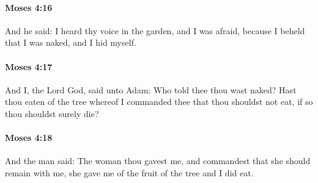 		\paragraph{Moses 4:16} %
			\label{MOSES-4-16}

			And he said: I heard thy voice in the garden, and I was afraid, because I beheld that I was naked, and I hid myself.


		\paragraph{Moses 4:17} %
			\label{MOSES-4-17}

			And I, the Lord God, said unto Adam: Who told thee thou wast naked? Hast thou eaten of the tree whereof I commanded thee that thou shouldst not eat, if so thou shouldst surely die?


		\paragraph{Moses 4:18} %
			\label{MOSES-4-18}

			And the man said: The woman thou gavest me, and commandest that she should remain with me, she gave me of the fruit of the tree and I did eat.



